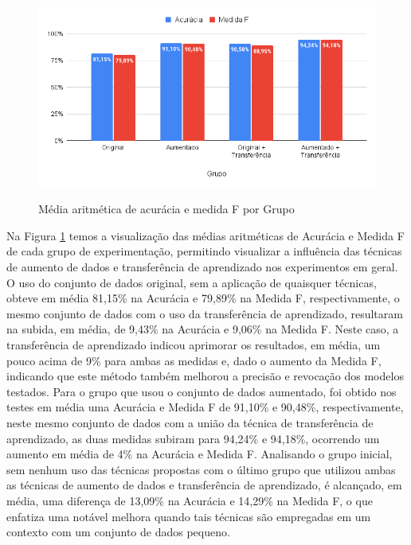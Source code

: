 \documentclass[
	12pt,				%
	oneside,			%
	a4paper,			%
	english,			%
	brazil				%
	]{abntex2ppgsi}
\begin{document}
\begin{figure}[H]
    \centering
    \caption{Média aritmética de acurácia e medida F por Grupo}
    \includegraphics[width=1.0\textwidth]{imagens/resultados_discussao/conclusao/media_acuracia_e_medida_f_vs_grupo.png}
    \label{fig:medida_acuracia_medida_f_vs_grupo}
\end{figure}

Na Figura \ref{fig:medida_acuracia_medida_f_vs_grupo} temos a visualização das médias aritméticas de Acurácia e Medida F de cada grupo de experimentação, permitindo visualizar a influência das técnicas de aumento de dados e transferência de aprendizado nos experimentos em geral. O uso do conjunto de dados original, sem a aplicação de quaisquer técnicas, obteve em média 81,15\% na Acurácia e 79,89\% na Medida F, respectivamente, o mesmo conjunto de dados com o uso da transferência de aprendizado, resultaram na subida, em média, de 9,43\% na Acurácia e 9,06\% na Medida F. Neste caso, a transferência de aprendizado indicou aprimorar os resultados, em média, um pouco acima de 9\% para ambas as medidas e, dado o aumento da Medida F, indicando que este método também melhorou a precisão e revocação dos modelos testados. Para o grupo que usou o conjunto de dados aumentado, foi obtido nos testes em média uma Acurácia e Medida F de 91,10\% e 90,48\%, respectivamente, neste mesmo conjunto de dados com a união da técnica de transferência de aprendizado, as duas medidas subiram para 94,24\% e 94,18\%, ocorrendo um aumento em média de 4\% na Acurácia e Medida F. Analisando o grupo inicial, sem nenhum uso das técnicas propostas com o último grupo que utilizou ambas as técnicas de aumento de dados e transferência de aprendizado, é alcançado, em média, uma diferença de 13,09\% na Acurácia e 14,29\% na Medida F, o que enfatiza uma notável melhora quando tais técnicas são empregadas em um contexto com um conjunto de dados pequeno.
\end{document}
